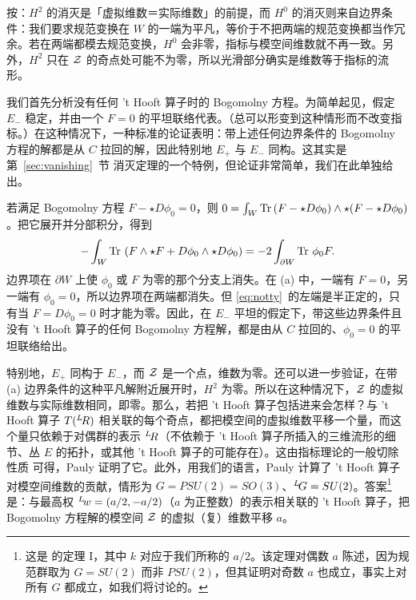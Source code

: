 \begin{yizhu}[易错点]
按：$H^2$ 的消灭是「虚拟维数＝实际维数」的前提，而 $H^0$ 的消灭则来自边界条件：我们要求规范变换在 $W$ 的一端为平凡，等价于不把两端的规范变换都当作冗余。若在两端都模去规范变换，$H^0$ 会非零，指标与模空间维数就不再一致。另外，$H^2$ 只在 ${{\mathcal{Z}}}$ 的奇点处可能不为零，所以光滑部分确实是维数等于指标的流形。
\end{yizhu}

我们首先分析没有任何 't Hooft 算子时的 Bogomolny 方程。为简单起见，假定 $E_-$ 稳定，并由一个 $F=0$ 的平坦联络代表。（总可以形变到这种情形而不改变指标。）在这种情况下，一种标准的论证表明：带上述任何边界条件的 Bogomolny 方程的解都是从 $C$ 拉回的解，因此特别地 $E_+$ 与 $E_-$ 同构。这其实是第~\ref{sec:vanishing}~节 消灭定理的一个特例，但论证非常简单，我们在此单独给出。

若满足 Bogomolny 方程 $F-\star D\phi_0=0$，则 $0=\int_W\operatorname{Tr}\,(F-\star D\phi_0)\wedge \star (F-\star D\phi_0)$。把它展开并分部积分，得到
\setcounter{equation}{1}
\begin{equation}\label{eq:notty}
-\int_W\operatorname{Tr}\,\left(F\wedge\star F+D\phi_0 \wedge \star
D\phi_0\right)=-2\int_{\partial W}\operatorname{Tr}\,\phi_0 F.
\end{equation}
边界项在 $\partial W$ 上使 $\phi_0$ 或 $F$ 为零的那个分支上消失。在 \utampo(a) 中，一端有 $F=0$，另一端有 $\phi_0=0$，所以边界项在两端都消失。但 \eqref{eq:notty}\ 的左端是半正定的，只有当 $F=D\phi_0=0$ 时才能为零。因此，在 $E_-$ 平坦的假定下，带这些边界条件且没有 't Hooft 算子的任何 Bogomolny 方程解，都是由从 $C$ 拉回的、$\phi_0=0$ 的平坦联络给出。

特别地，$E_+$ 同构于 $E_-$，而 ${{\mathcal{Z}}}$ 是一个点，维数为零。还可以进一步验证，在带 \utampo(a) 边界条件的这种平凡解附近展开时，$H^2$ 为零。所以在这种情况下，${{\mathcal{Z}}}$ 的虚拟维数与实际维数相同，即零。那么，若把 't Hooft 算子包括进来会怎样？与 't Hooft 算子 $T(^L\negthinspace R)$ 相关联的每个奇点，都把模空间的虚拟维数平移一个量，而这个量只依赖于对偶群的表示 $^L\negthinspace R$（不依赖于 't Hooft 算子所插入的三维流形的细节、丛 $E$ 的拓扑，或其他 't Hooft 算子的可能存在）。这由指标理论的一般切除性质 \cite{ref123} 可得，Pauly \cite{ref124} 证明了它。此外，用我们的语言，Pauly 计算了 't Hooft 算子对模空间维数的贡献，情形为 $G=PSU(2)=SO(3)$、$^L\negthinspace G=SU(2)$。答案\footnote{这是 \cite{ref124} 的定理 I，其中 $k$ 对应于我们所称的 $a/2$。该定理对偶数 $a$ 陈述，因为规范群取为 $G=SU(2)$ 而非 $PSU(2)$，但其证明对奇数 $a$ 也成立，事实上对所有 $G$ 都成立，如我们将讨论的。}是：与最高权 $^L\negthinspace w=(a/2,-a/2)$（$a$ 为正整数）的表示相关联的 't Hooft 算子，把 Bogomolny 方程解的模空间 ${{\mathcal{Z}}}$ 的虚拟（复）维数平移 $a$。

